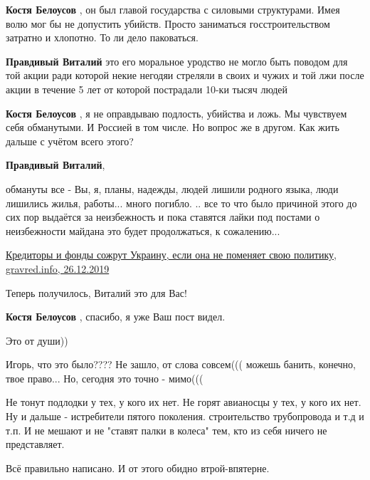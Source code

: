 \begin{itemize}
\begin{itemize}
\textbf{Костя Белоусов} , он был главой государства с силовыми структурами.
Имея волю мог бы не допустить убийств.
Просто заниматься госстроительством затратно и хлопотно.
То ли дело паковаться.

\textbf{Правдивый Виталий} это его моральное уродство не могло быть поводом для той акции ради которой некие негодяи стреляли в своих и чужих и той лжи после акции в течение 5 лет от которой пострадали 10-ки тысяч людей

\textbf{Костя Белоусов} , я не оправдываю подлость, убийства и ложь.
Мы чувствуем себя обманутыми. И Россией в том числе.
Но вопрос же в другом.
Как жить дальше с учётом всего этого?

\textbf{Правдивый Виталий}, 

обмануты все - Вы, я, планы, надежды, людей лишили родного языка, люди лишились
жилья, работы... много погибло. .. все то что было причиной этого до сих пор
выдаётся за неизбежность и пока ставятся лайки под постами о неизбежности
майдана это будет продолжаться, к сожалению...

\end{itemize} %


\href{https://glavred.info/opinions/10130288-kreditory-i-fondy-sozhrut-ukrainu-esli-ona-ne-pomenyaet-svoyu-politiku.html}{%
Кредиторы и фонды сожрут Украину, если она не поменяет свою политику, gravred.info, 26.12.2019%
}

Теперь получилось, Виталий это для Вас!

\textbf{Костя Белоусов} , спасибо, я уже Ваш пост видел.

Это от души))

Игорь, что это было???? Не зашло, от слова совсем((( можешь банить, конечно, твое право... Но, сегодня это точно - мимо(((


Не тонут подлодки у тех, у кого их нет. Не горят авианосцы у тех, у кого их
нет. Ну и дальше - истребители пятого поколения. строительство трубопровода и
т.д и т.п. И не мешают и не "ставят палки в колеса" тем, кто из себя ничего не
представляет.

Всё правильно написано. И от этого обидно втрой-впятерне.



\end{itemize}
